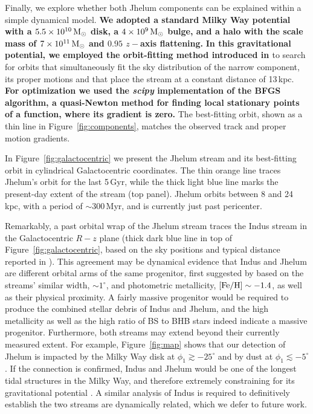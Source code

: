 \documentclass[twocolumn]{aastex62}
\newcommand{\package}[1]{\textsl{#1}}
\newcommand{\changes}[1]{{\textbf{#1}}}
\begin{document}
Finally, we explore whether both Jhelum components can be explained within a simple dynamical model.
\changes{We adopted a standard Milky Way potential \citep{gala} with a $5.5\times10^{10}\rm\, M_\odot$ \citet{mn1975} disk, a $4\times10^9\rm\, M_\odot$ \citet{hernquist1990} bulge, and a \citet{navarro1997} halo with the scale mass of $7\times10^{11}\rm\, M_\odot$ and $0.95$ $z-$axis flattening.}
\changes{In this gravitational potential, we employed the orbit-fitting method introduced in \citet{pwb}} to search for orbits that simultaneously fit the sky distribution of the narrow component, its proper motions and that place the stream at a constant distance of 13\,kpc.
\changes{For optimization we used the \package{scipy} implementation of the BFGS algorithm, a quasi-Newton method for finding local stationary points of a function, where its gradient is zero.}
The best-fitting orbit, shown as a thin line in Figure~\ref{fig:components}, matches the observed track and proper motion gradients.

In Figure~\ref{fig:galactocentric} we present the Jhelum stream and its best-fitting orbit in cylindrical Galactocentric coordinates.
The thin orange line traces Jhelum's orbit for the last 5\,Gyr, while the thick light blue line marks the present-day extent of the stream (top panel).
Jhelum orbits between 8 and 24\,kpc, with a period of $\sim300$\,Myr, and is currently just past pericenter.

Remarkably, a past orbital wrap of the Jhelum stream traces the Indus stream in the Galactocentric $R-z$ plane (thick dark blue line in top of Figure~\ref{fig:galactocentric}, based on the sky positions and typical distance reported in \citealt{shipp2018}).
This agreement may be dynamical evidence that Indus and Jhelum are different orbital arms of the same progenitor, first suggested by \citet{shipp2018} based on the streams' similar width, $\sim1^\circ$, and photometric metallicity, $\rm[Fe/H]\sim-1.4$, as well as their physical proximity.
A fairly massive progenitor would be required to produce the combined stellar debris of Indus and Jhelum, and the high metallicity as well as the high ratio of BS to BHB stars indeed indicate a massive progenitor.
Furthermore, both streams may extend beyond their currently measured extent.
For example, Figure~\ref{fig:map} shows that our detection of Jhelum is impacted by the Milky Way disk at $\phi_1\gtrsim-25^\circ$ and by dust at $\phi_1\lesssim-5^\circ$.
If the connection is confirmed, Indus and Jhelum would be one of the longest tidal structures in the Milky Way, and therefore extremely constraining for its gravitational potential \citep{bh2018}.
A similar analysis of Indus is required to definitively establish the two streams are dynamically related, which we defer to future work.
\end{document}
